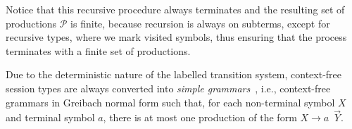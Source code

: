 
Notice that this recursive procedure always terminates and the resulting 
set of productions $\mathcal{P}$ is finite, because recursion is always 
on subterms, except for recursive types, where we mark visited symbols, thus 
ensuring that the process terminates with a finite set of productions.

Due to the deterministic nature of the labelled transition system, context-free 
session types are always converted into \emph{simple grammars}~\cite{baeten1993decidability}, i.e., 
context-free grammars in Greibach normal form such that, for each non-terminal 
symbol $X$ and terminal symbol $a$, there is at most one production of the form 
$X\rightarrow a \enspace \vec Y$.

